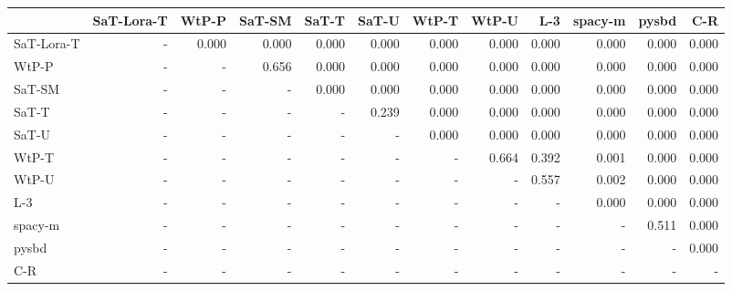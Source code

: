 \begin{tabular}{lrrrrrrrrrrr}
\toprule
 & SaT-Lora-T & WtP-P & SaT-SM & SaT-T & SaT-U & WtP-T & WtP-U & L-3 & spacy-m & pysbd & C-R \\
\midrule
SaT-Lora-T & - & 0.000 & 0.000 & 0.000 & 0.000 & 0.000 & 0.000 & 0.000 & 0.000 & 0.000 & 0.000 \\
WtP-P & - & - & 0.656 & 0.000 & 0.000 & 0.000 & 0.000 & 0.000 & 0.000 & 0.000 & 0.000 \\
SaT-SM & - & - & - & 0.000 & 0.000 & 0.000 & 0.000 & 0.000 & 0.000 & 0.000 & 0.000 \\
SaT-T & - & - & - & - & 0.239 & 0.000 & 0.000 & 0.000 & 0.000 & 0.000 & 0.000 \\
SaT-U & - & - & - & - & - & 0.000 & 0.000 & 0.000 & 0.000 & 0.000 & 0.000 \\
WtP-T & - & - & - & - & - & - & 0.664 & 0.392 & 0.001 & 0.000 & 0.000 \\
WtP-U & - & - & - & - & - & - & - & 0.557 & 0.002 & 0.000 & 0.000 \\
L-3 & - & - & - & - & - & - & - & - & 0.000 & 0.000 & 0.000 \\
spacy-m & - & - & - & - & - & - & - & - & - & 0.511 & 0.000 \\
pysbd & - & - & - & - & - & - & - & - & - & - & 0.000 \\
C-R & - & - & - & - & - & - & - & - & - & - & - \\
\bottomrule
\end{tabular}

